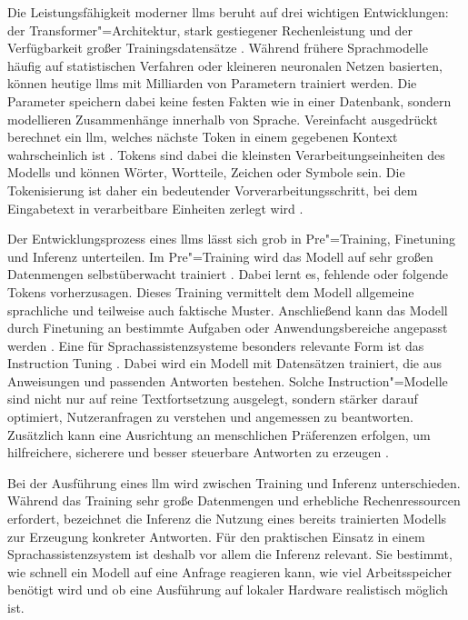 Die Leistungsfähigkeit moderner \glspl{llm} beruht auf drei wichtigen Entwicklungen: der Transformer"=Architektur, stark gestiegener Rechenleistung und der Verfügbarkeit großer Trainingsdatensätze \autocite{comprehensiveOverviewLLM}. Während frühere Sprachmodelle häufig auf statistischen Verfahren oder kleineren neuronalen Netzen basierten, können heutige \glspl{llm} mit Milliarden von Parametern trainiert werden. Die Parameter speichern dabei keine festen Fakten wie in einer Datenbank, sondern modellieren Zusammenhänge innerhalb von Sprache. Vereinfacht ausgedrückt berechnet ein \gls{llm}, welches nächste Token in einem gegebenen Kontext wahrscheinlich ist \autocite{comprehensiveOverviewLLM}. Tokens sind dabei die kleinsten Verarbeitungseinheiten des Modells und können Wörter, Wortteile, Zeichen oder Symbole sein. Die Tokenisierung ist daher ein bedeutender Vorverarbeitungsschritt, bei dem Eingabetext in verarbeitbare Einheiten zerlegt wird \autocite{comprehensiveOverviewLLM,voiceassistantIntroduction}.

Der Entwicklungsprozess eines \glspl{llm} lässt sich grob in Pre"=Training, Finetuning und Inferenz unterteilen. Im Pre"=Training wird das Modell auf sehr großen Datenmengen selbstüberwacht trainiert \autocite{comprehensiveOverviewLLM}. Dabei lernt es, fehlende oder folgende Tokens vorherzusagen. Dieses Training vermittelt dem Modell allgemeine sprachliche und teilweise auch faktische Muster. Anschließend kann das Modell durch Finetuning an bestimmte Aufgaben oder Anwendungsbereiche angepasst werden \autocite{comprehensiveOverviewLLM}. Eine für Sprachassistenzsysteme besonders relevante Form ist das Instruction Tuning \autocite{comprehensiveOverviewLLM,qwen2TechnicalReport}. Dabei wird ein Modell mit Datensätzen trainiert, die aus Anweisungen und passenden Antworten bestehen. Solche Instruction"=Modelle sind nicht nur auf reine Textfortsetzung ausgelegt, sondern stärker darauf optimiert, Nutzeranfragen zu verstehen und angemessen zu beantworten. Zusätzlich kann eine Ausrichtung an menschlichen Präferenzen erfolgen, um hilfreichere, sicherere und besser steuerbare Antworten zu erzeugen \autocite{qwen2TechnicalReport}.

Bei der Ausführung eines \gls{llm} wird zwischen Training und Inferenz unterschieden. Während das Training sehr große Datenmengen und erhebliche Rechenressourcen erfordert, bezeichnet die Inferenz die Nutzung eines bereits trainierten Modells zur Erzeugung konkreter Antworten. Für den praktischen Einsatz in einem Sprachassistenzsystem ist deshalb vor allem die Inferenz relevant. Sie bestimmt, wie schnell ein Modell auf eine Anfrage reagieren kann, wie viel Arbeitsspeicher benötigt wird und ob eine Ausführung auf lokaler Hardware realistisch möglich ist.

